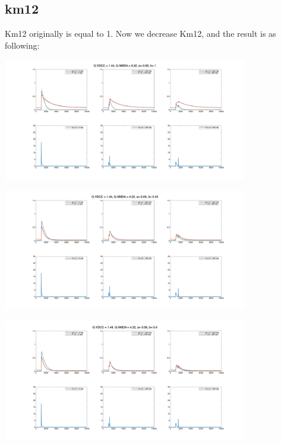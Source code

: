 \documentclass{article}
\begin{document}
\subsection{km12}
Km12 originally is equal to 1. Now we decrease Km12, and the result is as following:\\
\begin{minipage}{\textwidth} %
    \centering
    \includegraphics[width=0.8\textwidth]{G_VDCC=1.44_G_NMDA=4.32_a=0.060 b=1.00.png} %
    \label{fig:a0.25}
\end{minipage}
\begin{minipage}{\textwidth} %
    \centering
    \includegraphics[width=0.8\textwidth]{G_VDCC=1.44_G_NMDA=4.32_a=0.060 b=0.45.png} %
    \label{fig:a0.25}
\end{minipage}
\begin{minipage}{\textwidth} %
    \centering
    \includegraphics[width=0.8\textwidth]{G_VDCC=1.44_G_NMDA=4.32_a=0.060 b=0.40.png} %
    \label{fig:a0.25}
\end{minipage}
\end{document}
